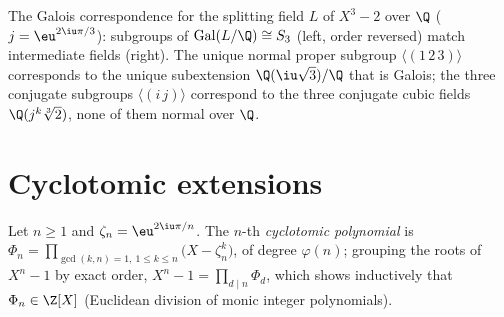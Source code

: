 \begin{omfigure}

{\small The Galois correspondence for the splitting field $L$ of
$X^3 - 2$ over $\Q$ ($j = \eu^{2\iu\pi/3}$): subgroups of
$\operatorname{Gal}(L/\Q) \cong S_3$ (left, order reversed)
match intermediate fields (right). The unique normal proper
subgroup $\langle(1\,2\,3)\rangle$ corresponds to the unique
subextension $\Q(\iu\sqrt3)/\Q$ that is Galois; the three
conjugate subgroups $\langle(i\,j)\rangle$ correspond to the
three conjugate cubic fields $\Q(j^k\sqrt[3]2)$, none of them
normal over $\Q$.}
\end{omfigure}

\section{Cyclotomic extensions}

\begin{definition}\label{def:b3:galois:cyclotomic}
Let $n \geq 1$ and $\zeta_n = \eu^{2\iu\pi/n}$. The $n$-th
\emph{cyclotomic polynomial} is
$\Phi_n = \prod_{\gcd(k,n)=1,\ 1 \le k \le n} \bigl(X -
\zeta_n^k\bigr)$, of degree $\varphi(n)$; grouping the roots of
$X^n - 1$ by exact order, $X^n - 1 = \prod_{d \mid n}\Phi_d$,
which shows inductively that $\Phi_n \in \Z[X]$ (Euclidean
division of monic integer polynomials).
\end{definition}

